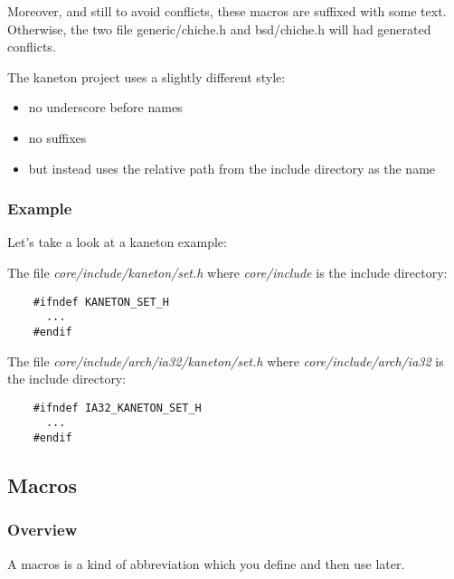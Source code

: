 {\begin{frame}
  \nl

  Moreover, and still to avoid conflicts, these macros are suffixed with
  some text. Otherwise, the two file generic/chiche.h and bsd/chiche.h
  will had generated conflicts.

  \nl

  The kaneton project uses a slightly different style:

  \begin{itemize}[<+->]
    \item
      no underscore before names
    \item
      no suffixes
    \item
      but instead uses the relative path from the include directory
      as the name
  \end{itemize}

\end{frame}


\begin{frame}[containsverbatim]
  \frametitle{Example}

  Let's take a look at a kaneton example:

  \nl

  The file \textit{core/include/kaneton/set.h} where \textit{core/include}
  is the include directory:

  \begin{verbatim}
    #ifndef KANETON_SET_H
      ...
    #endif
  \end{verbatim}

  The file \textit{core/include/arch/ia32/kaneton/set.h} where
  \textit{core/include/arch/ia32} is the include directory:

  \begin{verbatim}
    #ifndef IA32_KANETON_SET_H
      ...
    #endif
  \end{verbatim}
\end{frame}

%
%

\subsection{Macros}


\begin{frame}
  \frametitle{Overview}

  A macros is a kind of abbreviation which you define and then use later.

  \nl


\end{frame}}

